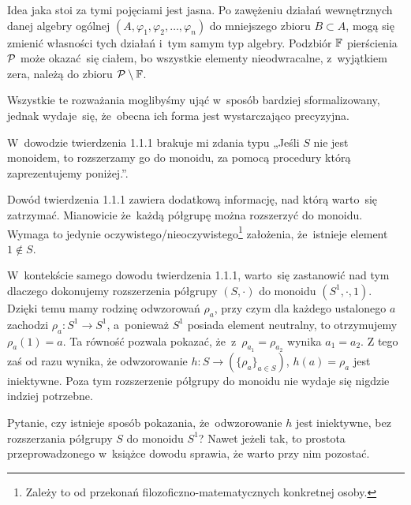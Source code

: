 \documentclass[a4paper,11pt]{article}
\begin{document}
Idea jaka stoi za tymi pojęciami jest jasna. Po zawężeniu działań
wewnętrznych danej algebry ogólnej
$( A, \varphi_{ 1 }, \varphi_{ 2 }, \ldots, \varphi_{ n } )$ do
mniejszego zbioru $B \subset A$, mogą się zmienić własności tych
działań i~tym samym typ algebry. Podzbiór $\mathbb{F}$ pierścienia $\mathcal{P}$
może okazać~się ciałem, bo wszystkie elementy nieodwracalne,
z~wyjątkiem zera, należą do zbioru $\mathcal{P} \setminus \mathbb{F}$.

Wszystkie te rozważania moglibyśmy ująć w~sposób bardziej
sformalizowany, jednak wydaje~się, że~obecna ich forma jest
wystarczająco precyzyjna.

\vspace{\spaceFour}





\start {} W~dowodzie twierdzenia 1.1.1 brakuje mi zdania typu
„Jeśli $S$ nie jest monoidem, to rozszerzamy go do monoidu, za pomocą
procedury którą zaprezentujemy poniżej.”.

\vspace{\spaceFour}





\start {} Dowód twierdzenia 1.1.1 zawiera dodatkową informację,
nad którą warto~się zatrzymać. Mianowicie że~każdą półgrupę można
rozszerzyć do monoidu. Wymaga to jedynie
oczywistego/nieoczywistego\footnote{Zależy to od przekonań
  filozoficzno-matematycznych konkretnej osoby.} założenia,
że~istnieje element $1 \notin S$.

W~kontekście samego dowodu twierdzenia 1.1.1, warto~się zastanowić nad
tym dlaczego dokonujemy rozszerzenia półgrupy $( S, \cdot )$ do
monoidu $( S^{ 1 }, \cdot, 1 )$. Dzięki temu mamy rodzinę odwzorowań
$\rho_{ a }$, przy czym dla każdego ustalonego $a$ zachodzi
$\rho_{ a } : S^{ 1 } \to S^{ 1 }$, a~ponieważ $S^{ 1 }$ posiada
element neutralny, to otrzymujemy $\rho_{ a }( 1 ) = a$. Ta równość
pozwala pokazać, że~z~$\rho_{ a_{ 1 } } = \rho_{ a_{ 2 } }$ wynika
$a_{ 1 } = a_{ 2 }$. Z tego zaś od razu wynika, że odwzorowanie
$h : S \to ( \{ \rho_{ a } \}_{ a \in S } )$, $h( a ) = \rho_{ a }$
jest iniektywne. Poza tym rozszerzenie półgrupy do monoidu nie wydaje
się nigdzie indziej potrzebne.

Pytanie, czy istnieje sposób pokazania, że~odwzorowanie $h$ jest
iniektywne, bez rozszerzania półgrupy $S$ do monoidu $S^{ 1 }$? Nawet
jeżeli tak, to prostota przeprowadzonego w~książce dowodu sprawia, że
warto przy nim pozostać.
\end{document}
